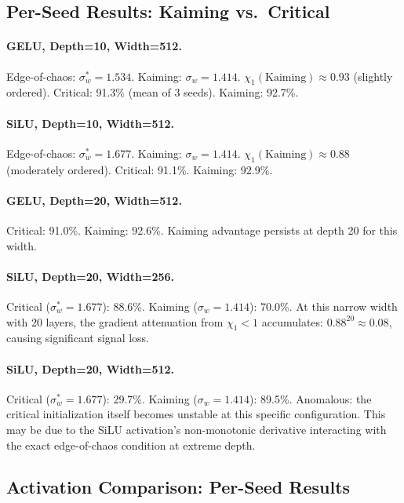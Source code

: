 \documentclass[10pt]{article}
\begin{document}
\subsection{Per-Seed Results: Kaiming vs.\ Critical}

\paragraph{GELU, Depth=10, Width=512.}
Edge-of-chaos: $\sigma_w^* = 1.534$.  Kaiming: $\sigma_w = 1.414$.
$\chi_1(\text{Kaiming}) \approx 0.93$ (slightly ordered).
Critical: 91.3\% (mean of 3 seeds). Kaiming: 92.7\%.

\paragraph{SiLU, Depth=10, Width=512.}
Edge-of-chaos: $\sigma_w^* = 1.677$.  Kaiming: $\sigma_w = 1.414$.
$\chi_1(\text{Kaiming}) \approx 0.88$ (moderately ordered).
Critical: 91.1\%. Kaiming: 92.9\%.

\paragraph{GELU, Depth=20, Width=512.}
Critical: 91.0\%. Kaiming: 92.6\%.  Kaiming advantage persists at depth 20 for this width.

\paragraph{SiLU, Depth=20, Width=256.}
Critical ($\sigma_w^* = 1.677$): 88.6\%. Kaiming ($\sigma_w = 1.414$): 70.0\%.
At this narrow width with 20 layers, the gradient attenuation from $\chi_1 < 1$ accumulates: $0.88^{20} \approx 0.08$, causing significant signal loss.

\paragraph{SiLU, Depth=20, Width=512.}
Critical ($\sigma_w^* = 1.677$): 29.7\%. Kaiming ($\sigma_w = 1.414$): 89.5\%.
Anomalous: the critical initialization itself becomes unstable at this specific configuration.  This may be due to the SiLU activation's non-monotonic derivative interacting with the exact edge-of-chaos condition at extreme depth.

\subsection{Activation Comparison: Per-Seed Results}
\end{document}
